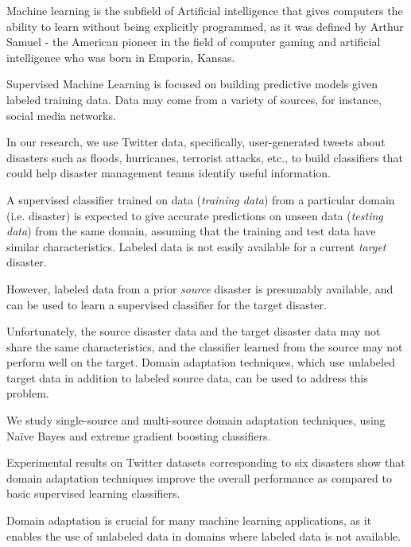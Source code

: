 
\pagestyle{empty}
\setlength{\baselineskip}{0.8cm}



Machine learning is the subfield of Artificial intelligence that gives computers the ability to learn without being explicitly programmed, as it was defined by Arthur Samuel - the American pioneer in the field of computer gaming and artificial intelligence who was born in Emporia, Kansas. 

Supervised Machine Learning is focused on building predictive models given labeled training data. Data may come from a variety of sources, for instance, social media networks. 

In our research, we use Twitter data, specifically, user-generated tweets about disasters such as floods, hurricanes, terrorist attacks, etc., to build classifiers that could help disaster management teams identify useful information. 

A supervised classifier trained on data (\textit{training data}) from a particular domain (i.e. disaster) is expected to give accurate predictions on unseen data (\textit{testing data}) from the same domain, assuming that the training and test data have similar characteristics. Labeled data is not easily available for a current \textit{target} disaster. 

However, labeled data from a prior \textit{source} disaster is presumably available, and can be used to learn a supervised classifier for the target disaster. 

Unfortunately, the source disaster data and the target disaster data may not share the same characteristics, and the classifier learned from the source may not perform well on the target. Domain adaptation techniques, which use unlabeled target data in addition to labeled source data, can be used to address this problem. 

We study single-source and multi-source domain adaptation techniques, using Naïve Bayes and extreme gradient boosting classifiers. 

Experimental results on Twitter datasets corresponding to six disasters show that domain adaptation techniques improve the overall performance as compared to basic supervised learning classifiers. 

Domain adaptation is crucial for many machine learning applications, as it enables the use of unlabeled data in domains where labeled data is not available.

